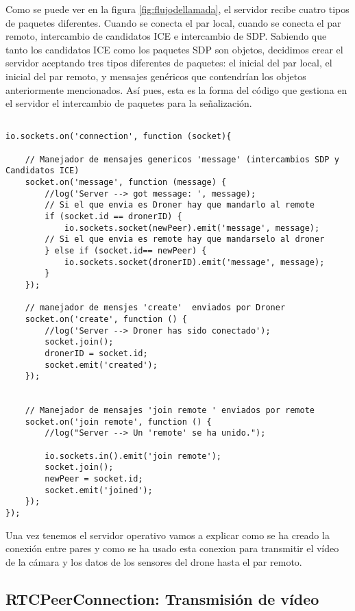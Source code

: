 Como se puede ver en la figura \ref{fig:flujodellamada}, el servidor recibe cuatro tipos de paquetes diferentes. Cuando se conecta el par local, cuando se conecta el par remoto, intercambio de candidatos ICE e intercambio de SDP. Sabiendo que tanto los candidatos ICE como los paquetes SDP son objetos, decidimos crear el servidor aceptando tres tipos diferentes de paquetes: el inicial del par local, el inicial del par remoto, y mensajes genéricos que contendrían los objetos anteriormente mencionados. Así pues, esta es la forma del código que gestiona en el servidor el intercambio de paquetes para la señalización.\\

\begin{lstlisting}[caption=Núcleo servidor de señalización]

io.sockets.on('connection', function (socket){

	// Manejador de mensajes genericos 'message' (intercambios SDP y Candidatos ICE)
	socket.on('message', function (message) {
		//log('Server --> got message: ', message);
		// Si el que envia es Droner hay que mandarlo al remote
		if (socket.id == dronerID) {
			io.sockets.socket(newPeer).emit('message', message);
		// Si el que envia es remote hay que mandarselo al droner
		} else if (socket.id== newPeer) {
			io.sockets.socket(dronerID).emit('message', message);
		} 
	});

	// manejador de mensjes 'create'  enviados por Droner
	socket.on('create', function () {
		//log('Server --> Droner has sido conectado');
		socket.join();
		dronerID = socket.id;
		socket.emit('created');
	});
	

	// Manejador de mensajes 'join remote ' enviados por remote
	socket.on('join remote', function () {
		//log("Server --> Un 'remote' se ha unido.");
		
		io.sockets.in().emit('join remote');
		socket.join();
		newPeer = socket.id;
		socket.emit('joined');
	});
});
\end{lstlisting}

Una vez tenemos el servidor operativo vamos a explicar como se ha creado la conexión entre pares y como se ha usado esta conexion para transmitir el vídeo de la cámara y los datos de los sensores del drone hasta el par remoto.\\

\subsection{RTCPeerConnection: Transmisión de vídeo}\label{subsec:transmisionvideo}

